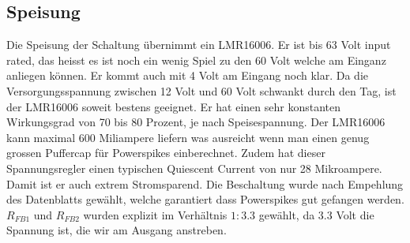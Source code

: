 {\begin{a3pages}
\end{a3pages}}


\subsection{Speisung}
\label{subsec:hw:sensor:supply}

Die Speisung der Schaltung übernimmt ein LMR16006. Er ist bis 63 Volt input rated, das heisst es ist noch ein wenig Spiel zu den 60 Volt welche am Einganz anliegen können. Er kommt auch mit 4 Volt am Eingang noch klar. Da die Versorgungsspannung zwischen 12 Volt und 60 Volt schwankt durch den Tag, ist der LMR16006 soweit bestens geeignet.
Er hat einen sehr konstanten Wirkungsgrad von 70 bis 80 Prozent, je nach Speisespannung.
Der LMR16006 kann maximal 600 Miliampere liefern was ausreicht wenn man einen genug grossen Puffercap für Powerspikes einberechnet.
Zudem hat dieser Spannungsregler einen typischen Quiescent Current von nur 28 Mikroampere. Damit ist er auch extrem Stromsparend.
Die Beschaltung wurde nach Empehlung des Datenblatts gewählt, welche garantiert dass Powerspikes gut gefangen werden. $R_{FB1}$ und $R_{FB2}$ wurden explizit im Verhältnis $1:3.3$ gewählt, da 3.3 Volt die Spannung ist, die wir am Ausgang anstreben.

